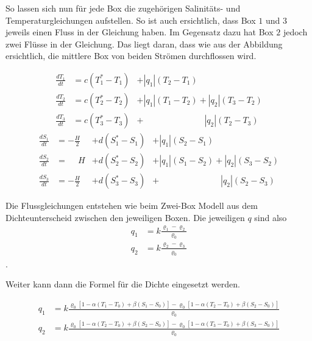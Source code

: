 So lassen sich nun für jede Box die zugehörigen Salinitäts- und Temperaturgleichungen aufstellen. So ist auch ersichtlich, dass Box $1$ und $3$ jeweils einen Fluss in der Gleichung haben. Im Gegensatz dazu hat Box $2$ jedoch zwei Flüsse in der Gleichung. Das liegt daran, dass wie aus der Abbildung ersichtlich, die mittlere Box von beiden Strömen durchflossen wird.


\begin{equation}\label{thermohalin:diffgl_3b2f}
\begin{aligned}
\frac{dT_1}{dt} &= c(T_1^*-T_1)&+|q_1|(T_2-T_1)\phantom{+|q_2|(T_3-T_2)}
\\
\frac{dT_2}{dt} &= c(T_2^*-T_2)&+|q_1|(T_1-T_2)+|q_2|(T_3-T_2)
\\
\frac{dT_3}{dt} &= c(T_3^*-T_3)&+ \phantom{+|q_1|(T_1-T_2)}|q_2|(T_2-T_3)
\end{aligned}
\end{equation}
\begin{equation}
\begin{aligned}
\frac{dS_1}{dt} &= -\frac{H}{2} &+ d(S_1^*-S_1)&+|q_1|(S_2-S_1)\phantom{+|q_2|(S_3-S_2)}
\\
\frac{dS_2}{dt} &= \phantom{-}H &+ d(S_2^*-S_2)&+|q_1|(S_1-S_2)+|q_2|(S_3-S_2)	
\\
\frac{dS_3}{dt} &= -\frac{H}{2} &+d(S_3^*-S_3)&+ \phantom{+|q_1|(S_1-S_2)}|q_2|(S_2-S_3)
\end{aligned}
\end{equation}	

Die Flussgleichungen entstehen wie beim Zwei-Box Modell aus dem Dichteunterscheid zwischen den jeweiligen Boxen. 
Die jeweiligen $q$ sind also 
\begin{equation}
\begin{aligned}
	q_1 &= k\frac{\varrho_1-\varrho_2}{\varrho_0}
	\\
	q_2 &= k\frac{\varrho_2-\varrho_3}{\varrho_0}
\end{aligned}
\end{equation}.

Weiter kann dann die Formel für die Dichte eingesetzt werden.

\begin{equation}
\begin{aligned}
q_1 &= k\frac{\varrho_0[1-\alpha(T_1-T_0)+\beta(S_1-S_0)]-\varrho_0[1-\alpha(T_2-T_0)+\beta(S_2-S_0)]}{\varrho_0}
\\
q_2 &= k\frac{\varrho_0[1-\alpha(T_2-T_0)+\beta(S_2-S_0)]-\varrho_0[1-\alpha(T_3-T_0)+\beta(S_3-S_0)]}{\varrho_0}
\end{aligned}
\end{equation}

